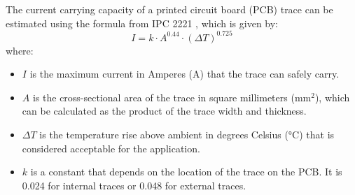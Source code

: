 \documentclass[12pt]{article} %
\begin{document}
\newline
\newline
\noindent The current carrying capacity of a printed circuit board (PCB) trace can be estimated using the formula from IPC 2221 \cite{ref_ipc_2221}, which is given by:
\begin{equation}
    I = k \cdot A^{0.44} \cdot (\Delta T)^{0.725}
\end{equation}
where:
\begin{itemize}
    \item \(I\) is the maximum current in Amperes (A) that the trace can safely carry.
    \item \(A\) is the cross-sectional area of the trace in square millimeters (mm\(^2\)), which can be calculated as the product of the trace width and thickness.
    \item \(\Delta T\) is the temperature rise above ambient in degrees Celsius (°C) that is considered acceptable for the application.
    \item \(k\) is a constant that depends on the location of the trace on the PCB. It is 0.024 for internal traces or 0.048 for external traces.
\end{itemize}
\end{document}
